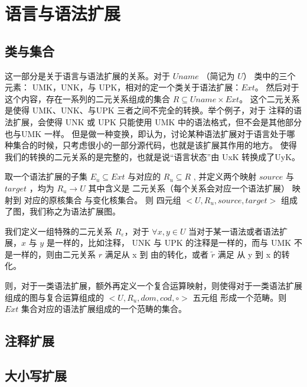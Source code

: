 \documentclass{ctexart}
\begin{document}
\section{语言与语法扩展}
\label{sec:languageextension}

\subsection{类与集合}
\label{sec:langexte:classNset}

这一部分是关于语言与语法扩展的关系。对于 $Uname$ （简记为 $U$） 类中的三个元素： UMK，UNK，与 UPK，相对的定一个类关于语法扩展：$Ext$。
然后对于这个内容，存在一系列的二元关系组成的集合 $ R \subseteq Uname \times Ext $。 这个二元关系是使得 UMK、UNK、与UPK
三者之间不完全的转换。举个例子，对于 注释的语法扩展，会使得 UNK 或 UPK 只能使用 UMK 中的语法格式，但不会是其他部分也与UMK 一样。
但是做一种变换，即认为，讨论某种语法扩展对于语言处于哪种集合的时候，只考虑很小的一部分源代码，也就是该扩展其作用的地方。
使得 我们的转换的二元关系的是完整的，也就是说“语言状态”由 UxK 转换成了UyK。

取一个语法扩展的子集 $E_u \subseteq Ext$ 与对应的 $R_u \subseteq R$ , 并定义两个映射 $source$ 与 $target$ ，均为
$ R_u \rightarrow U$ 其中含义是 二元关系（每个关系会对应一个语法扩展） 映射到 对应的原核集合 与变化核集合。
则 四元组 $<U,R_u,source,target>$ 组成了图，我们称之为语法扩展图。

我们定义一组特殊的二元关系 $R_\varepsilon$，对于 $ \forall x,y \in U$ 当对于某一语法或者语法扩展，$x$ 与 $y$ 是一样的，比如注释，
UNK 与 UPK 的注释是一样的，而与 UMK 不是一样的，则由二元关系 $r$ 满足从 x 到 由的转化，或者 $\widetilde{r}$ 满足 从 y 到 x 的转化。

则，对于一类语法扩展，额外再定义一个复合运算映射，则使得对于一类语法扩展组成的图与复合运算组成的 $<U,R_u,dom,cod,\circ>$ 五元组
形成一个范畴。则 $Ext$ 集合对应的语法扩展组成的一个范畴的集合。


\subsection{注释扩展}
\label{sec:langexte:comment}

\subsection{大小写扩展}
\label{sec:langexte:comment}
\end{document}
